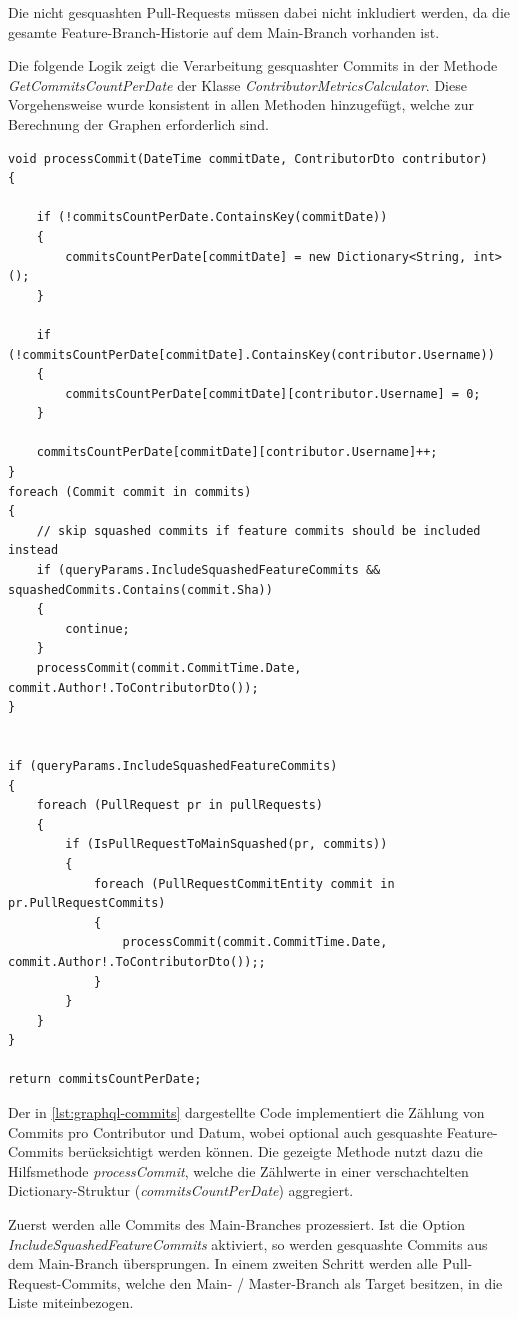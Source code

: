 Die nicht gesquashten Pull-Requests müssen dabei nicht inkludiert werden, da die gesamte Feature-Branch-Historie auf dem Main-Branch vorhanden ist. 

Die folgende Logik zeigt die Verarbeitung gesquashter Commits in der Methode \textit{GetCommitsCountPerDate} der Klasse \textit{ContributorMetricsCalculator}. Diese Vorgehensweise wurde konsistent in allen Methoden hinzugefügt, welche zur Berechnung der Graphen erforderlich sind.

\begin{lstlisting}[language=CSharp, caption={Verarbeitung gesquashter Commits in der Methode \textit{GetCommitsCountPerDate}}, label={lst:graphql-commits}]
void processCommit(DateTime commitDate, ContributorDto contributor)
{

	if (!commitsCountPerDate.ContainsKey(commitDate))
	{
		commitsCountPerDate[commitDate] = new Dictionary<String, int>();
	}

	if (!commitsCountPerDate[commitDate].ContainsKey(contributor.Username))
	{
		commitsCountPerDate[commitDate][contributor.Username] = 0;
	}

	commitsCountPerDate[commitDate][contributor.Username]++;
}
foreach (Commit commit in commits)
{
	// skip squashed commits if feature commits should be included instead
	if (queryParams.IncludeSquashedFeatureCommits && squashedCommits.Contains(commit.Sha))
	{
		continue;
	}
	processCommit(commit.CommitTime.Date, commit.Author!.ToContributorDto());
}


if (queryParams.IncludeSquashedFeatureCommits)
{
	foreach (PullRequest pr in pullRequests)
	{
		if (IsPullRequestToMainSquashed(pr, commits))
		{
			foreach (PullRequestCommitEntity commit in pr.PullRequestCommits)
			{
				processCommit(commit.CommitTime.Date, commit.Author!.ToContributorDto());;		
			}	
		}
	}
}

return commitsCountPerDate;
\end{lstlisting}

Der in \autoref{lst:graphql-commits} dargestellte Code implementiert die Zählung von Commits pro Contributor und Datum, wobei optional auch gesquashte Feature-Commits berücksichtigt werden können. Die gezeigte Methode nutzt dazu die Hilfsmethode \textit{processCommit}, welche die Zählwerte in einer verschachtelten Dictionary-Struktur (\textit{commitsCountPerDate}) aggregiert.

Zuerst werden alle Commits des Main-Branches prozessiert. Ist die Option \textit{IncludeSquashedFeatureCommits} aktiviert, so werden gesquashte Commits aus dem Main-Branch übersprungen. In einem zweiten Schritt werden alle Pull-Request-Commits, welche den Main- / Master-Branch als Target besitzen, in die Liste miteinbezogen. 


